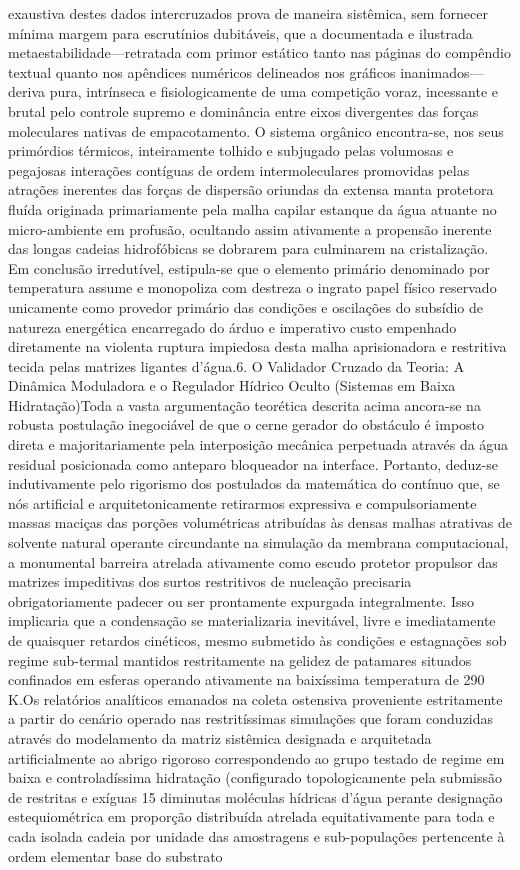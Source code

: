 exaustiva destes dados intercruzados prova de maneira sistêmica, sem fornecer mínima margem para escrutínios dubitáveis, que a documentada e ilustrada metaestabilidade—retratada com primor estático tanto nas páginas do compêndio textual quanto nos apêndices numéricos delineados nos gráficos inanimados—deriva pura, intrínseca e fisiologicamente de uma competição voraz, incessante e brutal pelo controle supremo e dominância entre eixos divergentes das forças moleculares nativas de empacotamento. O sistema orgânico encontra-se, nos seus primórdios térmicos, inteiramente tolhido e subjugado pelas volumosas e pegajosas interações contíguas de ordem intermoleculares promovidas pelas atrações inerentes das forças de dispersão oriundas da extensa manta protetora fluída originada primariamente pela malha capilar estanque da água atuante no micro-ambiente em profusão, ocultando assim ativamente a propensão inerente das longas cadeias hidrofóbicas se dobrarem para culminarem na cristalização. Em conclusão irredutível, estipula-se que o elemento primário denominado por temperatura assume e monopoliza com destreza o ingrato papel físico reservado unicamente como provedor primário das condições e oscilações do subsídio de natureza energética encarregado do árduo e imperativo custo empenhado diretamente na violenta ruptura impiedosa desta malha aprisionadora e restritiva tecida pelas matrizes ligantes d'água.6. O Validador Cruzado da Teoria: A Dinâmica Moduladora e o Regulador Hídrico Oculto (Sistemas em Baixa Hidratação)Toda a vasta argumentação teorética descrita acima ancora-se na robusta postulação inegociável de que o cerne gerador do obstáculo é imposto direta e majoritariamente pela interposição mecânica perpetuada através da água residual posicionada como anteparo bloqueador na interface. Portanto, deduz-se indutivamente pelo rigorismo dos postulados da matemática do contínuo que, se nós artificial e arquitetonicamente retirarmos expressiva e compulsoriamente massas maciças das porções volumétricas atribuídas às densas malhas atrativas de solvente natural operante circundante na simulação da membrana computacional, a monumental barreira atrelada ativamente como escudo protetor propulsor das matrizes impeditivas dos surtos restritivos de nucleação precisaria obrigatoriamente padecer ou ser prontamente expurgada integralmente. Isso implicaria que a condensação se materializaria inevitável, livre e imediatamente de quaisquer retardos cinéticos, mesmo submetido às condições e estagnações sob regime sub-termal mantidos restritamente na gelidez de patamares situados confinados em esferas operando ativamente na baixíssima temperatura de 290 K.Os relatórios analíticos emanados na coleta ostensiva proveniente estritamente a partir do cenário operado nas restritíssimas simulações que foram conduzidas através do modelamento da matriz sistêmica designada e arquitetada artificialmente ao abrigo rigoroso correspondendo ao grupo testado de regime em baixa e controladíssima hidratação (configurado topologicamente pela submissão de restritas e exíguas 15 diminutas moléculas hídricas d'água perante designação estequiométrica em proporção distribuída atrelada equitativamente para toda e cada isolada cadeia por unidade das amostragens e sub-populações pertencente à ordem elementar base do substrato 